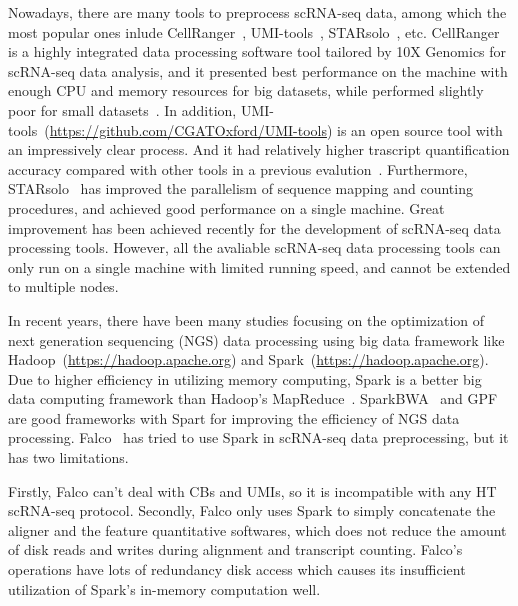 \documentclass[conference]{IEEEtran}
\begin{document}
Nowadays, there are many tools to preprocess scRNA-seq data, among which the most popular ones inlude CellRanger~\cite{Zheng2017Massively}, UMI-tools~\cite{Smith2017UMItools},  STARsolo~\cite{Blibaum2019STARsolo}, etc. 
CellRanger is a highly integrated data processing software tool tailored by 10X Genomics for scRNA-seq data analysis, and it presented best performance on the machine with enough CPU and memory resources for big datasets, while performed slightly poor for small datasets~\cite{Gao2020Comparison}. 
In addition, UMI-tools~(\url{https://github.com/CGATOxford/UMI-tools}) is an open source tool with an impressively clear process. And it had relatively higher trascript quantification accuracy compared with other tools in a previous evalution~\cite{Gao2020Comparison}. 
Furthermore, STARsolo~\cite{Blibaum2019STARsolo} has improved the parallelism of sequence mapping and counting procedures, and achieved good performance on a single machine.
Great improvement has been achieved recently for the development of scRNA-seq data processing tools. However, all the avaliable scRNA-seq data processing tools can only run on a single machine with limited running speed, and cannot be extended to multiple nodes.

In recent years, there have been many studies focusing on the optimization of next generation sequencing (NGS) data processing using big data framework like Hadoop~(\url{https://hadoop.apache.org}) and Spark~(\url{https://hadoop.apache.org}). 
Due to higher efficiency in utilizing memory computing, Spark is a better big data computing framework than Hadoop's MapReduce~\cite{Dean2008MapReduce, Zaharia2012Resilient}. 
SparkBWA~\cite{Abun2016SparkBWA} and GPF~\cite{Li2018Highperformance} are good frameworks with Spart for improving the efficiency of NGS data processing. 
Falco~\cite{Yang2017Falco} has tried to use Spark in scRNA-seq data preprocessing, but it has two limitations. 

Firstly, Falco can't deal with CBs and UMIs, so it is incompatible with any HT scRNA-seq protocol.
Secondly, Falco only uses Spark to simply concatenate the aligner and the feature quantitative softwares, which does not reduce the amount of disk reads and writes during alignment and transcript counting.
Falco’s operations have lots of redundancy disk access which causes its insufficient utilization of Spark’s in-memory computation well. 
\end{document}
